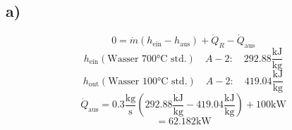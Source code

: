 

\subsection*{a)}
\[
0 = \dot{m} (h_{\text{ein}} - h_{\text{aus}}) + \dot{Q}_R - \dot{Q}_{\text{aus}}
\]
\[
h_{\text{ein}} \left( \text{Wasser 700°C std.} \right) \quad A-2: \quad 292.88 \frac{\text{kJ}}{\text{kg}}
\]
\[
h_{\text{out}} \left( \text{Wasser 100°C std.} \right) \quad A-2: \quad 419.04 \frac{\text{kJ}}{\text{kg}}
\]
\[
\dot{Q}_{\text{aus}} = 0.3 \frac{\text{kg}}{\text{s}} \left( 292.88 \frac{\text{kJ}}{\text{kg}} - 419.04 \frac{\text{kJ}}{\text{kg}} \right) + 100 \text{kW}
\]
\[
= 62.182 \text{kW}
\]